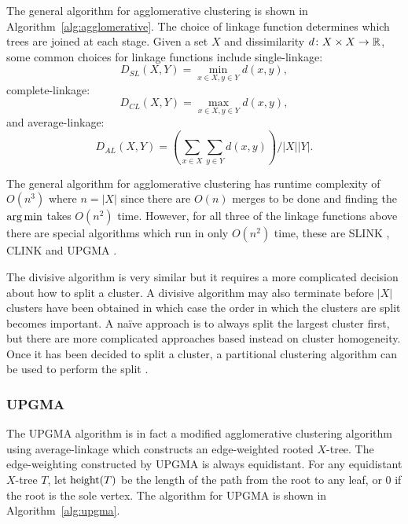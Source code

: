 The general algorithm for agglomerative clustering is shown in
Algorithm~\ref{alg:agglomerative}.  The choice of linkage function determines
which trees are joined at each stage.  Given a set $X$ and dissimilarity $d
\colon X \times X \to {\mathbb R}$, some common choices for linkage functions include
single-linkage:
\begin{equation}
  \label{eq:slink}
  D_{SL}(X,Y) = \min_{x \in X, y \in Y} d(x,y),
\end{equation}
complete-linkage:
\begin{equation}
  \label{eq:clink}
  D_{CL}(X,Y) = \max_{x \in X, y \in Y} d(x,y),
\end{equation}
and average-linkage:
\begin{equation}
  \label{eq:alink}
  D_{AL}(X,Y) = \left( \sum_{x \in X} \sum_{y \in Y} d(x,y) \right) / |X| |Y|.
\end{equation}

The general algorithm for agglomerative clustering has runtime complexity of
$O(n^3)$ where $n = |X|$ since there are $O(n)$ merges to be done and finding
the $\operatorname*{arg\,min}$ takes $O(n^2)$ time.  However, for all three of the linkage
functions above there are special algorithms which run in only $O(n^2)$ time,
these are SLINK \citep{sibson1973slink}, CLINK \citep{defays1977efficient} and
UPGMA \citep{sokal1958statistical}.

The divisive algorithm is very similar but it requires a more complicated
decision about how to split a cluster.  A divisive algorithm may also
terminate before $|X|$ clusters have been obtained in which case the order in
which the clusters are split becomes important.  A naïve approach is to always
split the largest cluster first, but there are more complicated approaches
based instead on cluster homogeneity.  Once it has been decided to split a
cluster, a partitional clustering algorithm can be used to perform the split
\citep{ding2002cluster}.

\subsubsection{UPGMA}
\label{sec:upgma}

The UPGMA algorithm is in fact a modified agglomerative clustering algorithm
using average-linkage which constructs an edge-weighted rooted $X$-tree.  The
edge-weighting constructed by UPGMA is always equidistant.  For any
equidistant $X$-tree $T$, let $\operatorname{height}(T)$ be the length of the path from the
root to any leaf, or 0 if the root is the sole vertex.  The algorithm for
UPGMA is shown in Algorithm~\ref{alg:upgma}.

